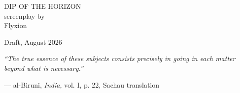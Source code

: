 \documentclass[12pt]{article}
\begin{document}
\thispagestyle{empty}
\begin{center}
\vspace*{2.3in}
{\Large DIP OF THE HORIZON}\\[0.5in]
{\normalsize screenplay by}\\[0.15in]
{\normalsize Flyxion}
\end{center}
\vfill
\begin{flushleft}
\footnotesize
Draft, August 2026\\
\end{flushleft}
\clearpage

\thispagestyle{empty}
\vspace*{3in}
\begin{center}
\begin{minipage}{4.2in}
\centering
\itshape ``The true essence of these subjects consists precisely in going in each matter beyond what is necessary.''
\end{minipage}
\end{center}
\vspace{0.4in}
\begin{center}
--- al-Biruni, \textit{India}, vol. I, p. 22, Sachau translation
\end{center}
\clearpage
\end{document}
